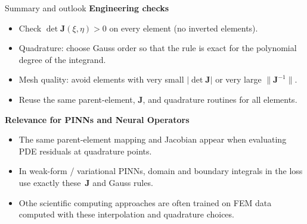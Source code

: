 \documentclass{beamer}
\begin{document}
\begin{frame}{Summary and outlook}
	\small
	\textbf{Engineering checks}
	\begin{itemize}
		\item Check $\det \mathbf{J}(\xi,\eta) > 0$ on every element (no inverted elements).
		\item Quadrature: choose Gauss order so that the rule is exact for the
		polynomial degree of the integrand.
		\item Mesh quality: avoid elements with very small $|\det \mathbf{J}|$ or very large $\|\mathbf{J}^{-1}\|$.
		\item Reuse the same parent-element, $\mathbf{J}$, and quadrature routines for all elements.
	\end{itemize}
	
	\vspace{0.6em}
	\textbf{Relevance for PINNs and Neural Operators}
	\begin{itemize}
		\item The same parent-element mapping and Jacobian appear when evaluating PDE residuals at quadrature points.
		\item In weak-form / variational PINNs, domain and boundary integrals in the loss use exactly these $\,\mathbf{J}$ and Gauss rules.
		\item Othe scientific computing approaches are often trained on FEM data computed with these interpolation and quadrature choices.
	\end{itemize}
\end{frame}
\end{document}
